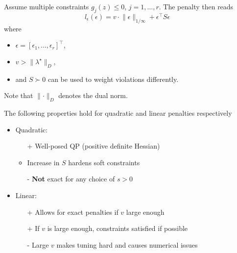 \newpar{}

Assume multiple constraints $g_j(z) \leq 0$, $j = 1, \dots, r$. The penalty then reads
\begin{equation*}
    l_\epsilon(\epsilon) = v \cdot \lVert \epsilon \rVert_{1/\infty} + \epsilon^\top S \epsilon
\end{equation*}
where
\begin{itemize}
    \item $\epsilon = {[\epsilon_1, \dots, \epsilon_r]}^\top$,
    \item $v > \lVert \lambda^\star \rVert_D$,
    \item and $S \succ 0$ can be used to weight violations differently.
\end{itemize}
\newpar{}
Note that $\lVert \cdot \rVert_D$ denotes the dual norm.

\newpar{}

The following properties hold for quadratic and linear penalties respectively
\begin{itemize}
    \item Quadratic:
          \begin{itemize}
              \item [+] Well-posed QP (positive definite Hessian)
              \item Increase in $S$ hardens soft constraints
              \item [-] \textbf{Not} exact for any choice of $s>0$
          \end{itemize}
    \item Linear:
          \begin{itemize}
              \item [+] Allows for exact penalties if $v$ large enough
              \item [+] If $v$ is large enough, constraints satisfied if possible
              \item [-] Large $v$ makes tuning hard and causes numerical issues
          \end{itemize}
\end{itemize}


